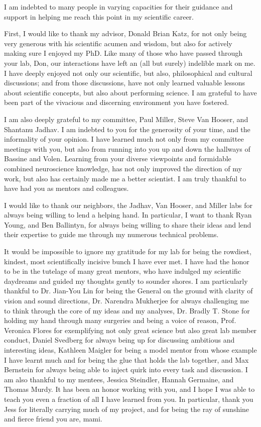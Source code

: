 \documentclass[openany,oneside]{brandeis-dissertation3.12}
\begin{document}
\begin{doublespace}
I am indebted to many people in varying capacities for their guidance and support in helping me reach this point in my scientific career.

First, I would like to thank my advisor, Donald Brian Katz, for not only being very generous with his scientific acumen and wisdom, but also for actively making sure I enjoyed my PhD. Like many of those who have passed through your lab, Don, our interactions have left an (all but surely) indelible mark on me. I have deeply enjoyed not only our scientific, but also, philosophical and cultural discussions; and from those discussions, have not only learned valuable lessons about scientific concepts, but also about performing science. I am grateful to have been part of the vivacious and discerning environment you have fostered. 

I am also deeply grateful to my committee, Paul Miller, Steve Van Hooser, and Shantanu Jadhav. I am indebted to you for the generosity of your time, and the informality of your opinion. I have learned much not only from my committee meetings with you, but also from running into you up and down the hallways of Bassine and Volen. Learning from your diverse viewpoints and formidable combined neuroscience knowledge, has not only improved the direction of my work, but also has certainly made me a better scientist. I am truly thankful to have had you as mentors and colleagues.

I would like to thank our neighbors, the Jadhav, Van Hooser, and Miller labs for always being willing to lend a helping hand. In particular, I want to thank Ryan Young, and Ben Ballintyn, for always being willing to share their ideas and lend their expertise to guide me through my numerous technical problems.

It would be impossible to ignore my gratitude for my lab for being the rowdiest, kindest, most scientifically incisive bunch I have ever met. I have had the honor to be in the tutelage of many great mentors, who have indulged my scientific daydreams and guided my thoughts gently to sounder shores. I am particularly thankful to Dr. Jian-You Lin for being the General on the ground with clarity of vision and sound directions, Dr. Narendra Mukherjee for always challenging me to think through the core of my ideas and my analyses, Dr. Bradly T. Stone for holding my hand through many surgeries and being a voice of reason, Prof. Veronica Flores for exemplifying not only great science but also great lab member conduct, Daniel Svedberg for always being up for discussing ambitious and interesting ideas, Kathleen Maigler for being a model mentor from whose example I have learnt much and for being the glue that holds the lab together, and Max Bernstein for always being able to inject quirk into every task and discussion. I am also thankful to my mentees, Jessica Steindler, Hannah Germaine, and Thomas Murdy. It has been an honor working with you, and I hope I was able to teach you even a fraction of all I have learned from you. In particular, thank you Jess for literally carrying much of my project, and for being the ray of sunshine and fierce friend you are, mami.


\end{doublespace}
\end{document}
